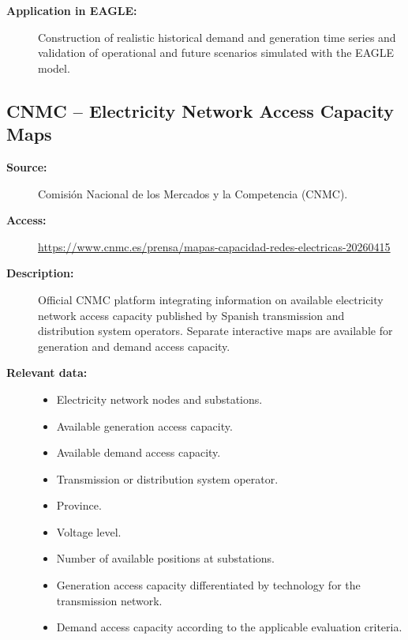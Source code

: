\begin{description}
    \item[\textbf{Application in EAGLE:}]
    Construction of realistic historical demand and generation time
    series and validation of operational and future scenarios simulated
    with the EAGLE model.

\end{description}

\subsection{CNMC -- Electricity Network Access Capacity Maps}

\begin{description}

    \item[\textbf{Source:}]
    Comisión Nacional de los Mercados y la Competencia (CNMC).

    \item[\textbf{Access:}]
    \url{https://www.cnmc.es/prensa/mapas-capacidad-redes-electricas-20260415}

    \item[\textbf{Description:}]
    Official CNMC platform integrating information on available electricity
    network access capacity published by Spanish transmission and distribution
    system operators. Separate interactive maps are available for generation
    and demand access capacity.

    \item[\textbf{Relevant data:}] \hfill
    \begin{itemize}
        \item Electricity network nodes and substations.
        \item Available generation access capacity.
        \item Available demand access capacity.
        \item Transmission or distribution system operator.
        \item Province.
        \item Voltage level.
        \item Number of available positions at substations.
        \item Generation access capacity differentiated by technology
        for the transmission network.
        \item Demand access capacity according to the applicable
        evaluation criteria.
    \end{itemize}


\end{description}
